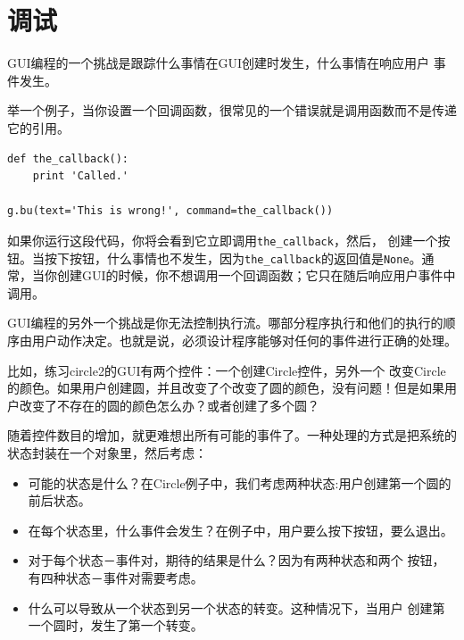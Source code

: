 \section{调试}


GUI编程的一个挑战是跟踪什么事情在GUI创建时发生，什么事情在响应用户
事件发生。


举一个例子，当你设置一个回调函数，很常见的一个错误就是调用函数而不是传递它的引用。

\beforeverb
\begin{verbatim}
def the_callback():
    print 'Called.'

g.bu(text='This is wrong!', command=the_callback())
\end{verbatim}
\afterverb

如果你运行这段代码，你将会看到它立即调用\verb"the_callback"，然后，
创建一个按钮。当按下按钮，什么事情也不发生，因为\verb"the_callback"的返回值是{\tt None}。通常，当你创建GUI的时候，你不想调用一个回调函数；它只在随后响应用户事件中调用。



GUI编程的另外一个挑战是你无法控制执行流。哪部分程序执行和他们的执行的顺序由用户动作决定。也就是说，必须设计程序能够对任何的事件进行正确的处理。

比如，练习{circle2}的GUI有两个控件：一个创建Circle控件，另外一个
改变Circle的颜色。如果用户创建圆，并且改变了个改变了圆的颜色，没有问题！但是如果用户改变了不存在的圆的颜色怎么办？或者创建了多个圆？

随着控件数目的增加，就更难想出所有可能的事件了。一种处理的方式是把系统的状态封装在一个对象里，然后考虑：

\begin{itemize}

\item 可能的状态是什么？在Circle例子中，我们考虑两种状态:用户创建第一个圆的前后状态。

\item 在每个状态里，什么事件会发生？在例子中，用户要么按下按钮，要么退出。

\item 对于每个状态－事件对，期待的结果是什么？因为有两种状态和两个
按钮，有四种状态－事件对需要考虑。

\item 什么可以导致从一个状态到另一个状态的转变。这种情况下，当用户
创建第一个圆时，发生了第一个转变。

\end{itemize}

